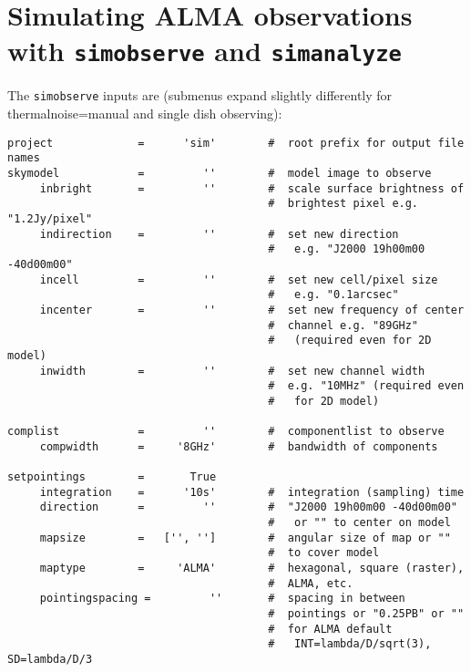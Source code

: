\section{Simulating ALMA observations with {\tt simobserve} and {\tt simanalyze}}
\label{section:sim.almasimmos}

The {\tt simobserve} inputs are (submenus expand slightly differently for thermalnoise=manual and single dish observing):
\small
\begin{verbatim}
project             =      'sim'        #  root prefix for output file names
skymodel            =         ''        #  model image to observe
     inbright       =         ''        #  scale surface brightness of
                                        #  brightest pixel e.g. "1.2Jy/pixel"
     indirection    =         ''        #  set new direction
                                        #   e.g. "J2000 19h00m00 -40d00m00"
     incell         =         ''        #  set new cell/pixel size
                                        #   e.g. "0.1arcsec"
     incenter       =         ''        #  set new frequency of center
                                        #  channel e.g. "89GHz"
                                        #   (required even for 2D model)
     inwidth        =         ''        #  set new channel width
                                        #  e.g. "10MHz" (required even
                                        #   for 2D model)

complist            =         ''        #  componentlist to observe
     compwidth      =     '8GHz'        #  bandwidth of components

setpointings        =       True        
     integration    =      '10s'        #  integration (sampling) time
     direction      =         ''        #  "J2000 19h00m00 -40d00m00"
                                        #   or "" to center on model
     mapsize        =   ['', '']        #  angular size of map or ""
                                        #  to cover model
     maptype        =     'ALMA'        #  hexagonal, square (raster),
                                        #  ALMA, etc.
     pointingspacing =         ''       #  spacing in between
                                        #  pointings or "0.25PB" or ""
                                        #  for ALMA default
                                        #   INT=lambda/D/sqrt(3), SD=lambda/D/3


\end{verbatim}
